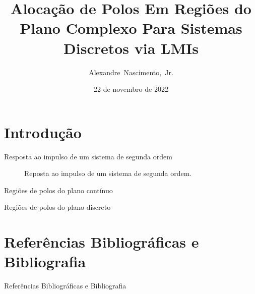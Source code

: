 \documentclass[aspectratio=169,10pt,t,xcolor={usenames,dvipsnames,x11names}]{beamer}
\title[]{Alocação de Polos Em Regiões do Plano Complexo Para Sistemas Discretos via LMIs}
\author[]{Alexandre~Nascimento,~Jr.}
\institute[]{
	Faculdade de Computação\\
	Universidade Federal de Mato Grosso do Sul
}
\date[]{22 de novembro de 2022}
\begin{document}
\frame{\maketitle}
\frame{\tableofcontents}

\section{Introdução}

\begin{frame}{Resposta ao impulso de um sistema de segunda ordem}
	\begin{figure}[!ht]
		\centering
		
		\caption{Reposta ao impulso de um sistema de segunda ordem.}
		\label{fig:ImpulseResponse}
	\end{figure}
\end{frame}

\begin{frame}[c]{Regiões de polos do plano contínuo}
	\begin{figure}[!ht]
		\centering
		\begin{subfigure}[t]{0.3\columnwidth}
				
				\caption{}
				\label{subfig:EstabilidadeRelativaS}
		\end{subfigure}\quad
		\begin{subfigure}[t]{0.3\columnwidth}
				
				\caption{}
				\label{subfig:TaxaDeAmortecimentoS}
		\end{subfigure}\quad
		\begin{subfigure}[t]{0.3\columnwidth}
			
			\caption{}
			\label{subfig:OscilacaoNaoAmortecidaS}
		\end{subfigure}
	\end{figure}
\end{frame}

\begin{frame}[c]{Regiões de polos do plano discreto}
	\begin{figure}[!ht]
		\centering
		\begin{subfigure}[t]{0.3\columnwidth}
				
				\caption{}
				\label{subfig:EstabilidadeRelativaZ}
		\end{subfigure}
		\begin{subfigure}[t]{0.3\columnwidth}
				
				\caption{}
				\label{subfig:TaxaDeAmortecimentoZ}
		\end{subfigure}
		\begin{subfigure}[t]{0.3\columnwidth}
			
			\caption{}
			\label{subfig:OscilacaoNaoAmortecidaZ}
		\end{subfigure}
	\end{figure}
\end{frame}

\section{Referências Bibliográficas e Bibliografia}
\begin{frame}[allowframebreaks]{Referências Bibliográficas e Bibliografia}
	\small
	
	
	\nocite{*}
\end{frame}
\end{document}
